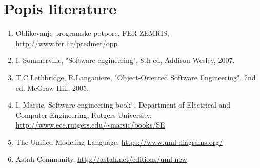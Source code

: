 \chapter*{Popis literature}
	 	
%	
%		
		
		\begin{enumerate}
			
			
			\item  Oblikovanje programske potpore, FER ZEMRIS, \url{http://www.fer.hr/predmet/opp}
			
			\item  I. Sommerville, "Software engineering", 8th ed, Addison Wesley, 2007.
			
			\item  T.C.Lethbridge, R.Langaniere, "Object-Oriented Software Engineering", 2nd ed. McGraw-Hill, 2005.
			
			\item  I. Marsic, Software engineering book``, Department of Electrical and Computer Engineering, Rutgers University, \url{http://www.ece.rutgers.edu/~marsic/books/SE}
			
			\item  The Unified Modeling Language, \url{https://www.uml-diagrams.org/}
			
			\item  Astah Community, \url{http://astah.net/editions/uml-new}
		\end{enumerate}
		
		 